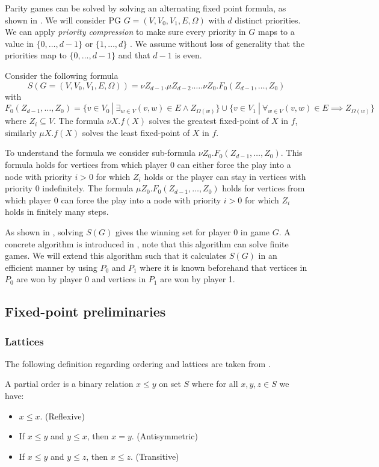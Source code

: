 Parity games can be solved by solving an alternating fixed point formula, as shown in \cite{WALUKIEWICZ2002311}. We will consider PG $G = (V,V_0,V_1, E, \Omega)$ with $d$ distinct priorities. We can apply \textit{priority compression} to make sure every priority in $G$ maps to a value in $\{0,\dots,d-1\}$ or $\{1, \dots, d\}$ \cite{SolvingInPractice,FPITE}. We assume without loss of generality that the priorities map to $\{0,\dots,d-1\}$ and that $d-1$ is even. 

Consider the following formula
\[ S(G = (V,V_0,V_1,E,\Omega)) = \nu Z_{d-1}. \mu Z_{d-2}. \dots . \nu Z_0. F_0(Z_{d-1},\dots,Z_0) \]
with
\[ F_0(Z_{d-1},\dots,Z_0) = \{ v \in V_0\ |\ \exists_{w\in V} (v,w) \in E \wedge Z_{\Omega(w)} \} \cup \{ v \in V_1\ |\ \forall_{w\in V} (v,w) \in E \implies Z_{\Omega(w)} \} \]
where $Z_i \subseteq V$. The formula $\nu X. f(X)$ solves the greatest fixed-point of $X$ in $f$, similarly $\mu X.f(X)$ solves the least fixed-point of $X$ in $f$.

To understand the formula we consider sub-formula $\nu Z_0. F_0(Z_{d-1},\dots,Z_0)$. This formula holds for vertices from which player $0$ can either force the play into a node with priority $i > 0$ for which $Z_i$ holds or the player can stay in vertices with priority $0$ indefinitely. The formula $\mu Z_0. F_0(Z_{d-1},\dots,Z_0)$ holds for vertices from which player $0$ can force the play into a node with priority $i > 0$ for which $Z_i$ holds in finitely many steps.

As shown in \cite{WALUKIEWICZ2002311}, solving $S(G)$ gives the winning set for player $0$ in game $G$. A concrete algorithm is introduced in \cite{FPITE}, note that this algorithm can solve finite games. We will extend this algorithm such that it calculates $S(G)$ in an efficient manner by using $P_0$ and $P_1$ where it is known beforehand that vertices in $P_0$ are won by player 0 and vertices in $P_1$ are won by player 1. 

\subsection{Fixed-point preliminaries}
\subsubsection{Lattices}
The following definition regarding ordering and lattices are taken from \cite{birkhoff1940lattice}.
\begin{definition}
	A partial order is a binary relation $x \leq y$ on set $S$ where for all $x,y,z \in S$ we have:
	\begin{itemize}
		\item $x \leq x$. (Reflexive)
		\item If $x \leq y$ and $y \leq x$, then $x=y$. (Antisymmetric)
		\item If $x \leq y$ and $y \leq z$, then $x \leq z$. (Transitive)
	\end{itemize}
\end{definition}

